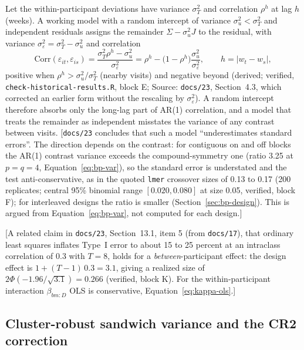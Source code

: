 \documentclass[11pt]{article}
\newcommand{\note}[1]{\textcolor{blue!60!black}{\small [#1]}}
\newcommand{\code}[1]{\texttt{#1}}
\begin{document}
Let the within-participant deviations have variance $\sigma_T^2$ and
correlation $\rho^{h}$ at lag $h$ (weeks). A working model with a random
intercept of variance $\sigma_u^2 < \sigma_T^2$ and independent
residuals assigns the remainder $\Sigma - \sigma_u^2 J$ to the
residual, with variance $\sigma_\varepsilon^2 = \sigma_T^2 - \sigma_u^2$
and correlation
\begin{equation}
\mathrm{Corr}(\varepsilon_{it}, \varepsilon_{is}) =
  \frac{\sigma_T^2\rho^{h} - \sigma_u^2}{\sigma_\varepsilon^2}
  = \rho^{h} - \big(1 - \rho^{h}\big)\frac{\sigma_u^2}{\sigma_\varepsilon^2},
  \qquad h = |w_t - w_s|,
\label{eq:inva-ri}
\end{equation}
positive when $\rho^{h} > \sigma_u^2/\sigma_T^2$ (nearby visits) and
negative beyond (derived; verified, \code{check-historical-results.R}, block E;
Source: \code{docs/23}, Section~4.3, which corrected an earlier form
without the rescaling by $\sigma_\varepsilon^2$). A random intercept
therefore absorbs only the long-lag part of AR(1) correlation, and a
model that treats the remainder as independent misstates the variance of
any contrast between visits. \note{\code{docs/23} concludes that such a
model ``underestimates standard errors''. The direction depends on the
contrast: for contiguous on and off blocks the AR(1) contrast variance
exceeds the compound-symmetry one (ratio 3.25 at $p = q = 4$,
Equation~\eqref{eq:bp-var}), so the standard error is understated and
the test anti-conservative, as in the quoted \code{lmer} crossover sizes
of 0.13 to 0.17 (200 replicates; central 95\% binomial range
$[0.020, 0.080]$ at size 0.05, verified, block F); for interleaved
designs the ratio is smaller (Section~\ref{sec:bp-design}). This is
argued from Equation~\eqref{eq:bp-var}, not computed for each design.}

\note{A related claim in \code{docs/23}, Section~13.1, item 5 (from
\code{docs/17}), that ordinary least squares inflates Type~I error to
about 15 to 25 percent at an intraclass correlation of 0.3 with $T = 8$,
holds for a \emph{between}-participant effect: the design effect is
$1 + (T - 1)\,0.3 = 3.1$, giving a realized size of
$2\Phi(-1.96/\sqrt{3.1}) = 0.266$ (verified, block K). For the
within-participant interaction $\beta_{bm:D}$ OLS is conservative,
Equation~\eqref{eq:kappa-ols}.}

\subsection{Cluster-robust sandwich variance and the CR2 correction}
\label{sec:sandwich}
\end{document}
